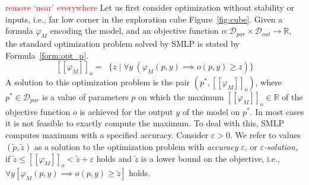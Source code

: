 \documentclass[a4paper,parskip=half]{article} %
\newcommand\removed[1]{}
\newcommand\added[1]{#1}
\newcommand\changedto[2]{%
    \removed{#1}%
    \added{#2}}
\newcommand*\eqdef=
\newcommand*\regmax[2]{[[{#1}]]_{#2}}
\newcommand*\objv{o}
\newcommand*\todofb[2][]{\todo[color=cyan!30,tickmarkheight=.2em,size=\scriptsize,#1]{FB: #2}}
\newcommand\todozk[1]{\textcolor{red}{#1}}
\begin{document}
\strut\todozk{remove `near' everywhere}%
Let us first consider optimization without stability or inputs, i.e., far low corner in the exploration cube Figure~\ref{fig:cube}. %
%
Given a %
formula
$\varphi_M$ encoding the model, and an objective function 
$\objv:%
\mathcal{D}_{\mathit{par}}\times
\mathcal{D}_\mathit{out}\to\mathbb R$, the
standard optimization problem solved by SMLP is stated by Formula~\eqref{form:opt_p}.
%
 \begin{equation}\label{form:opt_p}
 \regmax{\varphi_M}{\objv}
 \eqdef\mathop{\max\limits_{p}} \{z \mid  
    \forall y\changedto[{~(} \varphi_M(p,y)  \implies  
    \objv(p,y) \geq z
    \changedto])\}
\end{equation}
A solution to this optimization problem %
is the pair $(p^*,\regmax{\varphi_M}{\objv})$, where 
$p^*{}\in\mathcal{D}_{\mathit{par}}$ is a value of parameters $p$ on which the maximum $\regmax{\varphi_M}{\objv}\in\mathbb R$ of the objective function $\objv$ is achieved
for the output $y$ of the model on $p^*$.
In most cases it is not feasible to exactly compute the maximum.
To deal with this, SMLP computes maximum with a specified accuracy. 
Consider $\varepsilon >0$. 
We refer to %
values $(\tilde p,\tilde z)$ as a
solution to the optimization problem with
\emph{accuracy} $\varepsilon$, or \emph{$\varepsilon$-solution},
if $\tilde z\leq \regmax{ \varphi_M}{\objv}  <\tilde z+\varepsilon$ holds and
%
$\tilde z$ is a lower bound on the objective, i.e., $\forall y [ \varphi_M(p,y)  \implies  
    \objv(p,y) \geq \tilde z] $ holds.
\end{document}
